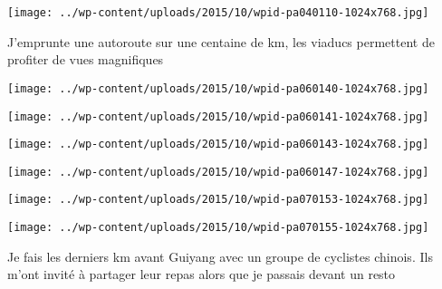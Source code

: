  

 

\begin{center} \texttt{[image: ../wp-content/uploads/2015/10/wpid-pa040110-1024x768.jpg]} \end{center}

 

 J'emprunte une autoroute sur une centaine de km, les viaducs permettent de profiter de vues magnifiques 

 

\begin{center} \texttt{[image: ../wp-content/uploads/2015/10/wpid-pa060140-1024x768.jpg]} \end{center}

 

 

\begin{center} \texttt{[image: ../wp-content/uploads/2015/10/wpid-pa060141-1024x768.jpg]} \end{center}

 

 

\begin{center} \texttt{[image: ../wp-content/uploads/2015/10/wpid-pa060143-1024x768.jpg]} \end{center}

 

 

\begin{center} \texttt{[image: ../wp-content/uploads/2015/10/wpid-pa060147-1024x768.jpg]} \end{center}

 

 

\begin{center} \texttt{[image: ../wp-content/uploads/2015/10/wpid-pa070153-1024x768.jpg]} \end{center}

 

 

\begin{center} \texttt{[image: ../wp-content/uploads/2015/10/wpid-pa070155-1024x768.jpg]} \end{center}

 

 Je fais les derniers km avant Guiyang avec un groupe de cyclistes chinois. Ils m'ont invité à partager leur repas alors que je passais devant un resto 

